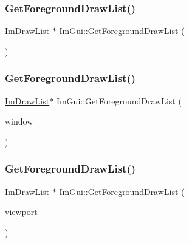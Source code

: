 \mbox{\label{namespaceImGui_a718d48e3636f9df63e4820d0fef34e78}} 
\subsubsection{\texorpdfstring{Get\+Foreground\+Draw\+List()}{GetForegroundDrawList()}\hspace{0.1cm}{\footnotesize\ttfamily [1/3]}}
{\footnotesize\ttfamily \hyperlink{structImDrawList}{Im\+Draw\+List} $\ast$ Im\+Gui\+::\+Get\+Foreground\+Draw\+List (\begin{DoxyParamCaption}{ }\end{DoxyParamCaption})}

\mbox{\label{namespaceImGui_a263ee0f99c7736041b45403326d3e224}} 
\subsubsection{\texorpdfstring{Get\+Foreground\+Draw\+List()}{GetForegroundDrawList()}\hspace{0.1cm}{\footnotesize\ttfamily [2/3]}}
{\footnotesize\ttfamily \hyperlink{structImDrawList}{Im\+Draw\+List}$\ast$ Im\+Gui\+::\+Get\+Foreground\+Draw\+List (\begin{DoxyParamCaption}\item[{\hyperlink{structImGuiWindow}{Im\+Gui\+Window} $\ast$}]{window }\end{DoxyParamCaption})\hspace{0.3cm}{\ttfamily [inline]}}

\mbox{\label{namespaceImGui_a07eee0014d66b8698d14b1635ea18f2d}} 
\subsubsection{\texorpdfstring{Get\+Foreground\+Draw\+List()}{GetForegroundDrawList()}\hspace{0.1cm}{\footnotesize\ttfamily [3/3]}}
{\footnotesize\ttfamily \hyperlink{structImDrawList}{Im\+Draw\+List} $\ast$ Im\+Gui\+::\+Get\+Foreground\+Draw\+List (\begin{DoxyParamCaption}\item[{\hyperlink{structImGuiViewport}{Im\+Gui\+Viewport} $\ast$}]{viewport }\end{DoxyParamCaption})}


